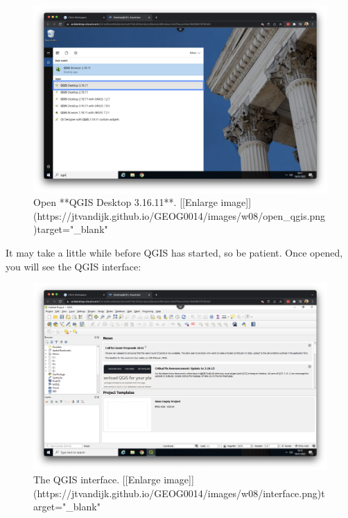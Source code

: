 \documentclass[
]{book}
\begin{document}
\begin{figure}

{\centering \includegraphics[width=850pt]{images/w08/open_qgis} 

}

\caption{Open **QGIS Desktop 3.16.11**. [[Enlarge image]](https://jtvandijk.github.io/GEOG0014/images/w08/open_qgis.png){target="_blank"}}\label{fig:open-qgis}
\end{figure}

It may take a little while before QGIS has started, so be patient. Once opened, you will see the QGIS interface:

\begin{figure}

{\centering \includegraphics[width=850pt]{images/w08/interface} 

}

\caption{The QGIS interface. [[Enlarge image]](https://jtvandijk.github.io/GEOG0014/images/w08/interface.png){target="_blank"}}\label{fig:interface-qgis}
\end{figure}
\end{document}
